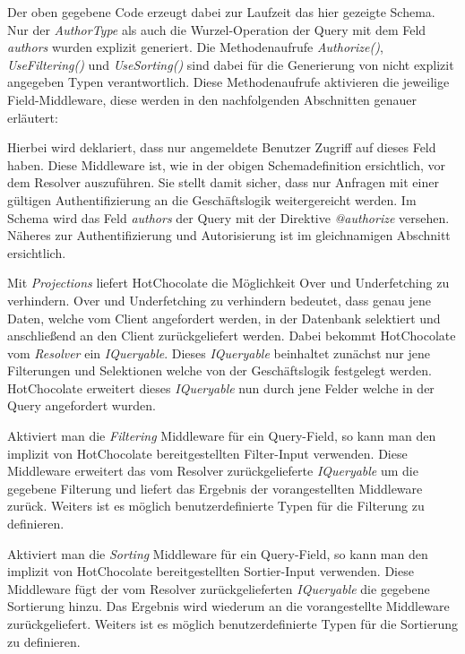 Der oben gegebene Code erzeugt dabei zur Laufzeit das hier gezeigte Schema.
Nur der \textit{AuthorType} als auch die Wurzel-Operation der Query mit dem Feld \textit{authors} wurden explizit generiert.
Die Methodenaufrufe \textit{Authorize()}, \textit{UseFiltering()} und \textit{UseSorting()} sind dabei für die Generierung von nicht explizit angegeben Typen verantwortlich.
Diese Methodenaufrufe aktivieren die jeweilige Field-Middleware, diese werden in den nachfolgenden Abschnitten genauer erläutert:

Hierbei wird deklariert, dass nur angemeldete Benutzer Zugriff auf dieses Feld haben.
Diese Middleware ist, wie in der obigen Schemadefinition ersichtlich, vor dem Resolver auszuführen.
Sie stellt damit sicher, dass nur Anfragen mit einer gültigen Authentifizierung an die Geschäftslogik weitergereicht werden.
Im Schema wird das Feld \textit{authors} der Query mit der Direktive \textit{@authorize} versehen.
Näheres zur Authentifizierung und Autorisierung ist im gleichnamigen Abschnitt ersichtlich.

Mit \textit{Projections} liefert HotChocolate die Möglichkeit Over und Underfetching zu verhindern.
Over und Underfetching zu verhindern bedeutet, dass genau jene Daten, welche vom Client angefordert werden, in der Datenbank selektiert und anschließend an den Client zurückgeliefert werden.
Dabei bekommt HotChocolate vom \textit{Resolver} ein \textit{IQueryable}.
Dieses \textit{IQueryable} beinhaltet zunächst nur jene Filterungen und Selektionen welche von der Geschäftslogik festgelegt werden.
HotChocolate erweitert dieses \textit{IQueryable} nun durch jene Felder welche in der Query angefordert wurden.

Aktiviert man die \textit{Filtering} Middleware für ein Query-Field, so kann man den implizit von HotChocolate bereitgestellten Filter-Input verwenden.
Diese Middleware erweitert das vom Resolver zurückgelieferte \textit{IQueryable} um die gegebene Filterung und liefert das Ergebnis der vorangestellten Middleware zurück.
Weiters ist es möglich benutzerdefinierte Typen für die Filterung zu definieren.

Aktiviert man die \textit{Sorting} Middleware für ein Query-Field, so kann man den implizit von HotChocolate bereitgestellten Sortier-Input verwenden.
Diese Middleware fügt der vom Resolver zurückgelieferten \textit{IQueryable} die gegebene Sortierung hinzu.
Das Ergebnis wird wiederum an die vorangestellte Middleware zurückgeliefert.
Weiters ist es möglich benutzerdefinierte Typen für die Sortierung zu definieren.

